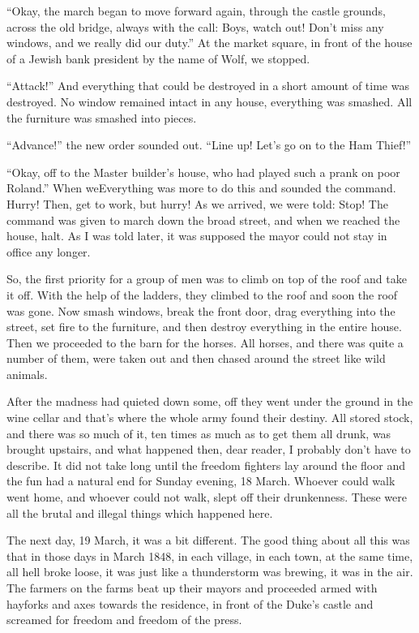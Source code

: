 \documentclass{article}
\begin{document}
``Okay, the march began to move forward again, through the castle grounds, across the old bridge, always with the call: Boys, watch out! Don't miss any windows, and we really did our duty.'' At the market square, in front of the house of a Jewish bank president by the name of Wolf, we stopped.

``Attack!'' And everything that could be destroyed in a short amount of time was destroyed. No window remained intact in any house, everything was smashed. All the furniture was smashed into pieces.

``Advance!'' the new order sounded out. ``Line up! Let's go on to the Ham Thief!''

``Okay, off to the Master builder's house, who had played such a prank on poor Roland.'' When weEverything was more to do this and sounded the command. Hurry! Then, get to work, but hurry! As we arrived, we were told: Stop! The command was given to march down the broad street, and when we reached the house, halt. As I was told later, it was supposed the mayor could not stay in office any longer.

So, the first priority for a group of men was to climb on top of the roof and take it off. With the help of the ladders, they climbed to the roof and soon the roof was gone. Now smash windows, break the front door, drag everything into the street, set fire to the furniture, and then destroy everything in the entire house. Then we proceeded to the barn for the horses. All horses, and there was quite a number of them, were taken out and then chased around the street like wild animals.

After the madness had quieted down some, off they went under the ground in the wine cellar and that's where the whole army found their destiny. All stored stock, and there was so much of it, ten times as much as to get them all drunk, was brought upstairs, and what happened then, dear reader, I probably don't have to describe. It did not take long until the freedom fighters lay around the floor and the fun had a natural end for Sunday evening, 18 March. Whoever could walk went home, and whoever could not walk, slept off their drunkenness. These were all the brutal and illegal things which happened here.

The next day, 19 March, it was a bit different. The good thing about all this was that in those days in March 1848, in each village, in each town, at the same time, all hell broke loose, it was just like a thunderstorm was brewing, it was in the air. The farmers on the farms beat up their mayors and proceeded armed with hayforks and axes towards the residence, in front of the Duke's castle and screamed for freedom and freedom of the press.
\end{document}
